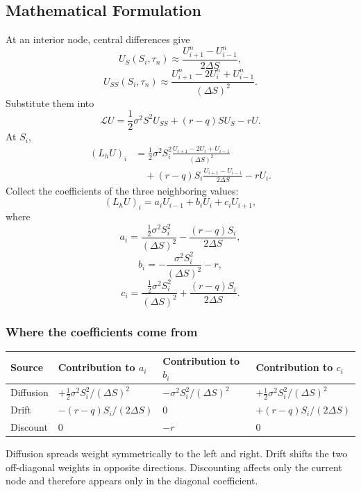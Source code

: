 \subsection{Mathematical Formulation}
At an interior node, central differences give
\[
  U_S(S_i,\tau_n)
  \approx
  \frac{U_{i+1}^n-U_{i-1}^n}{2\Delta S},
\]
\[
  U_{SS}(S_i,\tau_n)
  \approx
  \frac{U_{i+1}^n-2U_i^n+U_{i-1}^n}{(\Delta S)^2}.
\]
Substitute them into
\[
  \mathcal{L}U
  =
  \frac12\sigma^2S^2U_{SS}
  +(r-q)SU_S-rU.
\]
At \(S_i\),
\begin{align*}
  (L_hU)_i
  &=
  \frac12\sigma^2S_i^2
  \frac{U_{i+1}-2U_i+U_{i-1}}{(\Delta S)^2}\\
  &\quad
  +(r-q)S_i
  \frac{U_{i+1}-U_{i-1}}{2\Delta S}
  -rU_i.
\end{align*}
Collect the coefficients of the three neighboring values:
\[
  (L_hU)_i=a_iU_{i-1}+b_iU_i+c_iU_{i+1},
\]
where
\[
  a_i=
  \frac{\tfrac12\sigma^2S_i^2}{(\Delta S)^2}
  -\frac{(r-q)S_i}{2\Delta S},
\]
\[
  b_i=
  -\frac{\sigma^2S_i^2}{(\Delta S)^2}-r,
\]
\[
  c_i=
  \frac{\tfrac12\sigma^2S_i^2}{(\Delta S)^2}
  +\frac{(r-q)S_i}{2\Delta S}.
\]

\subsubsection{Where the coefficients come from}
\begin{center}
\begin{tabular}{>{\raggedright\arraybackslash}p{}
                >{\raggedright\arraybackslash}p{}
                >{\raggedright\arraybackslash}p{}
                >{\raggedright\arraybackslash}p{}}
\toprule
Source & Contribution to \(a_i\) & Contribution to \(b_i\) & Contribution to \(c_i\)\\
\midrule
Diffusion
& \(+\tfrac12\sigma^2S_i^2/(\Delta S)^2\)
& \(-\sigma^2S_i^2/(\Delta S)^2\)
& \(+\tfrac12\sigma^2S_i^2/(\Delta S)^2\)\\
Drift
& \(-(r-q)S_i/(2\Delta S)\)
& \(0\)
& \(+(r-q)S_i/(2\Delta S)\)\\
Discount
& \(0\)
& \(-r\)
& \(0\)\\
\bottomrule
\end{tabular}
\end{center}

\begin{readerintuition}
Diffusion spreads weight symmetrically to the left and right. Drift shifts the
two off-diagonal weights in opposite directions. Discounting affects only the
current node and therefore appears only in the diagonal coefficient.
\end{readerintuition}

